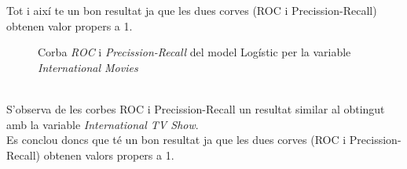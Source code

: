 \documentclass[a4paper, 11pt]{article}
\begin{document}
Tot i així te un bon resultat ja que les dues corves (ROC i Precission-Recall) obtenen valor propers a 1.
\begin{figure}[h]
\centering
    \caption{Corba \textit{ROC} i \textit{Precission-Recall} del model Logístic per la variable \textit{International Movies}}
    \label{fig:my_label}
\end{figure}\\
S'observa de les corbes ROC i Precission-Recall un resultat similar al obtingut amb la variable \textit{International TV Show}.\\
Es conclou doncs que té un bon resultat ja que les dues corves (ROC i Precission-Recall) obtenen valors propers a 1.
\newpage
\end{document}

